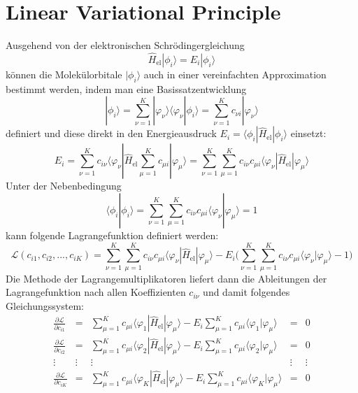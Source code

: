 \documentclass[9pt]{report}
\begin{document}
\newpage
\section{Linear Variational Principle}
Ausgehend von der elektronischen Schrödingergleichung
\begin{equation}
\hat{H}_{\mathrm{el}}|\phi_i\rangle = E_i|\phi_i\rangle
\end{equation}
können die Molekülorbitale $|\phi_i\rangle$ auch in einer vereinfachten Approximation bestimmt werden, indem man eine Basissatzentwicklung
\begin{equation}
|\phi_i\rangle = \sum_{\nu=1}^{K}|\varphi_{\nu}\rangle\langle\varphi_{\nu}|\phi_i\rangle = \sum_{\nu=1}^{K}c_{\nu i}|\varphi_{\nu}\rangle
\end{equation}
definiert und diese direkt in den Energieausdruck $E_i = \langle\phi_i|\hat{H}_{\mathrm{el}}|\phi_i\rangle$ einsetzt:
\begin{equation}
E_i = \sum_{\nu=1}^{K}c_{i\nu}\langle\varphi_{\nu}|\hat{H}_{\mathrm{el}}\sum_{\mu=1}^{K}c_{\mu i}|\varphi_{\mu}\rangle = \sum_{\nu=1}^{K}\sum_{\mu=1}^{K}c_{i\nu}c_{\mu i}\langle\varphi_{\nu}|\hat{H}_{\mathrm{el}}|\varphi_{\mu}\rangle
\end{equation}
Unter der Nebenbedingung
\begin{equation}
\langle\phi_i|\phi_i\rangle = \sum_{\nu=1}^{K}\sum_{\mu=1}^{K}c_{i\nu}c_{\mu i}\langle\varphi_{\nu}|\varphi_{\mu}\rangle = 1
\end{equation}
kann folgende Lagrangefunktion definiert werden:
\begin{equation}
\mathcal{L}(c_{i1},c_{i2},...,c_{iK}) = \sum_{\nu=1}^{K}\sum_{\mu=1}^{K}c_{i\nu}c_{\mu i}\langle\varphi_{\nu}|\hat{H}_{\mathrm{el}}|\varphi_{\mu}\rangle -E_i\bigg(\sum_{\nu=1}^{K}\sum_{\mu=1}^{K}c_{i\nu}c_{\mu i}\langle\varphi_{\nu}|\varphi_{\mu}\rangle -1\bigg)
\end{equation}
Die Methode der Lagrangemultiplikatoren liefert dann die Ableitungen der Lagrangefunktion nach allen Koeffizienten $c_{i\nu}$ und damit folgendes Gleichungssystem:
\begin{equation}
\renewcommand{\arraystretch}{2.0}
\begin{array}{|ccccc|}
\displaystyle\frac{\partial\mathcal{L}}{\partial c_{i1}} & = &  \displaystyle\sum_{\mu=1}^{K}c_{\mu i}\langle\varphi_{1}|\hat{H}_{\mathrm{el}}|\varphi_{\mu}\rangle -E_i\sum_{\mu=1}^{K}c_{\mu i}\langle\varphi_{1}|\varphi_{\mu}\rangle & = & 0\\
\displaystyle\frac{\partial\mathcal{L}}{\partial c_{i2}} & = &  \displaystyle\sum_{\mu=1}^{K}c_{\mu i}\langle\varphi_{2}|\hat{H}_{\mathrm{el}}|\varphi_{\mu}\rangle -E_i\sum_{\mu=1}^{K}c_{\mu i}\langle\varphi_{2}|\varphi_{\mu}\rangle & = & 0\\
\vdots & \vdots & \vdots  &  \vdots  & \vdots \\
\displaystyle\frac{\partial\mathcal{L}}{\partial c_{iK}} &  = & \displaystyle\sum_{\mu=1}^{K}c_{\mu i}\langle\varphi_{K}|\hat{H}_{\mathrm{el}}|\varphi_{\mu}\rangle -E_i\sum_{\mu=1}^{K}c_{\mu i}\langle\varphi_{K}|\varphi_{\mu}\rangle  & =  & 0
\end{array}
\end{equation}
\end{document}
